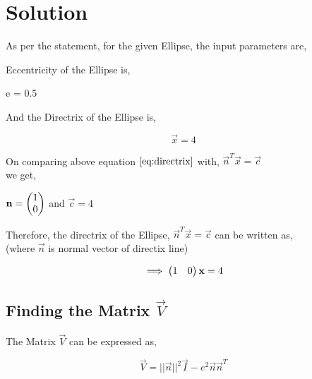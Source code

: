 \documentclass[journal,10pt,twocolumn]{article}
\begin{document}
\section{Solution}
\vspace{0.25cm}
As per the statement, for the given Ellipse, the input parameters are,\\
\begin{flushleft}
Eccentricity of the Ellipse is,\\
\end{flushleft}
\center
e = 0.5 \\
\endcenter
\begin{flushleft}
And the Directrix of the Ellipse is,\\
\end{flushleft}
\begin{equation}
\vec{x}=4 \label{eq:directrix}
\end{equation}
\begin{flushleft}
On comparing above equation $\eqref{eq:directrix}$ with, $\vec{n}^T\vec{x}=\vec{c}$\\
we get,\\
\end{flushleft}
$\mathbf{n}=\begin{pmatrix}1\\0\end{pmatrix}$ and $\vec{c}=4$\\
\begin{flushleft}
Therefore, the directrix of the Ellipse, $\vec{n}^T\vec{x}=\vec{c}$ can be written as,\\
\vspace{0.2cm}
(where $\vec{n}$ is normal vector of directix line)
\end{flushleft}
\begin{equation}
\implies \begin{pmatrix}1&0\end{pmatrix} \mathbf{x}=4
\end{equation}
\begin{flushleft}

\subsection{Finding the Matrix $\vec{V}$}
\end{flushleft}
\vspace{0.25cm}
\begin{flushleft}
The Matrix $\vec{V}$ can be expressed as,\\
\end{flushleft}
\begin{equation}
\vec{V} =||\vec{n}||^2\vec{I}-e^2\vec{n}\vec{n}^T   
\end{equation}
\end{document}
